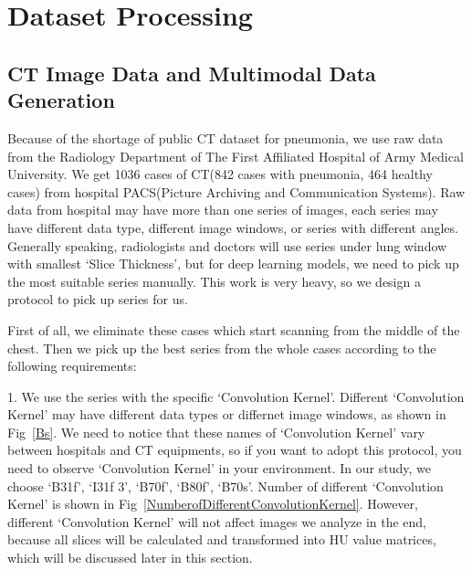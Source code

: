\section{Dataset Processing}
\label{datasetprocessing}
\subsection{CT Image Data and Multimodal Data Generation}
\label{ctimagedata}
Because of the shortage of public CT dataset for pneumonia, we use raw data from the Radiology Department of The First Affiliated Hospital of Army Medical University. We get 1036 cases of CT(842 cases with pneumonia, 464 healthy cases) from hospital PACS(Picture Archiving and Communication Systems). Raw data from hospital may have more than one series of images, each series may have different data type, different image windows, or series with different angles. 
Generally speaking, radiologists and doctors will use series under lung window with smallest `Slice Thickness', but for deep learning models, we need to pick up the most suitable series manually. This work is very heavy, so we design a protocol to pick up series for us.

First of all, we eliminate these cases which start scanning from the middle of the chest. Then we pick up the best series from the whole cases according to the following requirements:

1. We use the series with the specific `Convolution Kernel'. Different `Convolution Kernel' may have different data types or differnet image windows, as shown in Fig~\ref{Bs}. We need to notice that these names of `Convolution Kernel' vary between hospitals and CT equipments, so if you want to adopt this protocol, you need to observe `Convolution Kernel' in your environment. In our study, we choose `B31f', `I31f 3', `B70f', `B80f', `B70s'. Number of different `Convolution Kernel' is shown in Fig~\ref{NumberofDifferentConvolutionKernel}. 
However, different `Convolution Kernel' will not affect images we analyze in the end, because all slices will be calculated and transformed into HU value matrices, which will be discussed later in this section.


